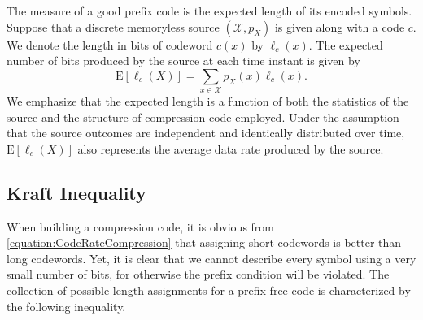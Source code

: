 The measure of a good prefix code is the expected length of its encoded symbols.
Suppose that a discrete memoryless source $(\mathcal{X}, p_X)$ is given along with a code $c$.
We denote the length in bits of codeword $c(x)$ by $\ell_c(x)$.
The expected number of bits produced by the source at each time instant is given by
\begin{equation} \label{equation:CodeRateCompression}
\mathrm{E} [ \ell_c (X) ] = \sum_{x \in \mathcal{X}} p_X(x) \ell_c(x) .
\end{equation}
We emphasize that the expected length is a function of both the statistics of the source and the structure of compression code employed.
Under the assumption that the source outcomes are independent and identically distributed over time, $\mathrm{E} [ \ell_c (X)]$ also represents the average data rate produced by the source.


\subsection{Kraft Inequality}

When building a compression code, it is obvious from \eqref{equation:CodeRateCompression} that assigning short codewords is better than long codewords.
Yet, it is clear that we cannot describe every symbol using a very small number of bits, for otherwise the prefix condition will be violated.
The collection of possible length assignments for a prefix-free code is characterized by the following inequality.

